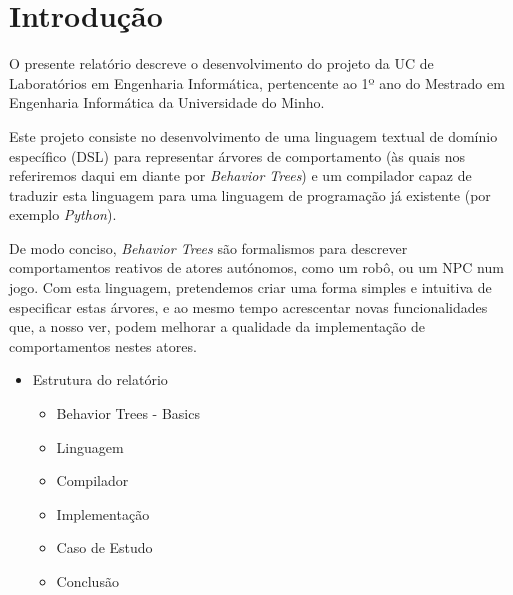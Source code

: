 
\chapter{Introdução} %

\label{Chapter1} %


\newcommand{\keyword}[1]{\textbf{#1}}
\newcommand{\tabhead}[1]{\textbf{#1}}
\newcommand{\code}[1]{\texttt{#1}}
\newcommand{\file}[1]{\texttt{\bfseries#1}}
\newcommand{\option}[1]{\texttt{\itshape#1}}


O presente relatório descreve o desenvolvimento do projeto da UC de Laboratórios em Engenharia Informática, pertencente ao 1º ano do Mestrado em Engenharia Informática da Universidade do Minho.

Este projeto consiste no desenvolvimento de uma linguagem textual de domínio específico (DSL) para representar árvores de comportamento (às quais nos referiremos daqui em diante por \textit{Behavior Trees}) e um compilador capaz de traduzir esta linguagem para uma linguagem de programação já existente (por exemplo \textit{Python}).

De modo conciso, \textit{Behavior Trees} são formalismos para descrever comportamentos reativos de atores autónomos, como um robô, ou um NPC num jogo.
Com esta linguagem, pretendemos criar uma forma simples e intuitiva de especificar estas árvores, e ao mesmo tempo acrescentar novas funcionalidades que, a nosso ver, podem melhorar a qualidade da implementação de comportamentos nestes atores.


\begin{itemize}
    \item Estrutura do relatório
    \begin{itemize}
        \item Behavior Trees - Basics
        \item Linguagem
        \item Compilador
        \item Implementação
        \item Caso de Estudo
        \item Conclusão
    \end{itemize}

\end{itemize}

